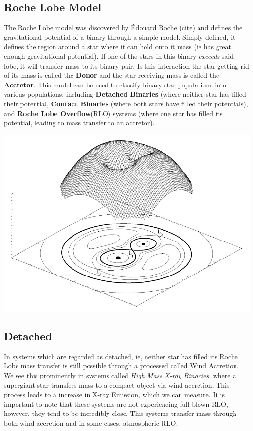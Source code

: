 \documentclass[12pt, letterpaper]{article}
\begin{document}
    
    \subsection{\centering Roche Lobe Model} %
    The Roche Lobe model was discovered by Édouard Roche (cite) and defines the gravitational potential of a binary through a simple model. Simply defined, it defines the region around a star where it can hold onto it mass (ie has great enough gravitational potential). If one of the stars in this binary \textit{exceeds} said lobe, it will transfer mass to its binary pair. Is this interaction the star getting rid of its mass is called the \textbf{Donor} and the star receiving mass is called the \textbf{Accretor}. This model can be used to classify binary star populations into various populations, including \textbf{Detached Binaries} (where neither star has filled their potential, \textbf{Contact Binaries} (where both stars have filled their potentials), and \textbf{Roche Lobe Overflow}(RLO) systems (where one star has filled its potential, leading to mass transfer to an accretor).
    
    \includegraphics[width=\textwidth]{Figs/RochePotential.jpg}

        \subsection{\centering Detached}
        In systems which are regarded as detached, ie, neither star has filled its Roche Lobe mass transfer is still possible through a processed called Wind Accretion. We see this prominently in systems called \textit{High Mass X-ray Binaries}, where a supergiant star transfers mass to a compact object via wind accretion. This process leads to a increase in X-ray Emission, which we can measure.  \cite{TaurisvandenHeuvel+2023} It is important to note that these systems are not experiencing full-blown RLO, however, they tend to be incredibly close. \cite{TaurisvandenHeuvel+2023} This systems transfer mass through both wind accretion and in some cases, atmospheric RLO.
\end{document}
